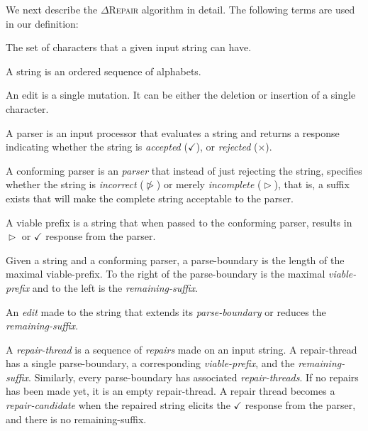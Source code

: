 \documentclass[acmsmall,screen,review,anonymous]{acmart}
\def\Rincomplete{\texttt{\color{incompletecolor}\textbf{$\vartriangleright$}}\xspace}
\def\Rincorrect{\texttt{\color{incorrectcolor}\textbf{$\ntriangleright$}}\xspace}
\def\Rvalid{\texttt{\color{validcolor}\textbf{$\checkmark$}}\xspace}
\def\Rreject{\texttt{\color{incorrectcolor}\textbf{$\times$}}\xspace}
\newcommand{\approach}{\textsc{$\Delta$Repair}\xspace}
\newcommand{\drepair}{\approach}
\begin{document}
We next describe the \drepair algorithm in detail.
The following terms are used in our definition: %
\begin{description}[labelwidth=!, labelindent=0pt]
\item[alphabet] The set of characters that a given input string can have.

\item[string] A string is an ordered sequence of alphabets.

\item[edit] An edit is a single mutation. It can be either the deletion
or insertion of a single character.

\item[parser] A parser is an input processor that evaluates a string and returns
a response indicating whether the string is \emph{accepted} (\Rvalid), or \emph{rejected} (\Rreject).

\item[conforming parser] A conforming parser is an \emph{parser} that 
instead of just rejecting the string, specifies whether
    the string is \emph{incorrect} (\Rincorrect) or merely \emph{incomplete} (\Rincomplete), that is, a suffix exists that
will make the complete string acceptable to the parser.

\item[viable-prefix] A viable prefix is a string that when passed to the conforming parser,
 results in \Rincomplete or \Rvalid response from the parser.

\item[parse-boundary] Given a string and a conforming parser, a parse-boundary is the
length of the maximal viable-prefix. To the right of the parse-boundary is the maximal
\emph{viable-prefix} and to the left is the \emph{remaining-suffix}.

\item[repair] An \emph{edit} made to the string that extends its \emph{parse-boundary}
  or reduces the \emph{remaining-suffix}.

\item[repair-thread] A \emph{repair-thread} is a sequence of \emph{repairs} made on an
input string. A repair-thread has a single parse-boundary, a corresponding
\emph{viable-prefix}, and the \emph{remaining-suffix}.
Similarly, every parse-boundary has associated \emph{repair-threads}.
If no repairs has been made yet, it is an empty repair-thread.
A repair thread becomes a \emph{repair-candidate} when the repaired string
elicits the \Rvalid response from the parser, and there is no remaining-suffix.


\end{description}
\end{document}
